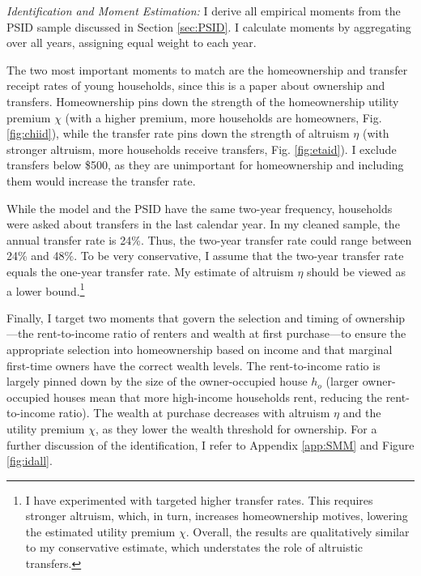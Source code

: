 \documentclass[12pt]{article}
\begin{document}
\textit{Identification and Moment Estimation:}
I derive all empirical moments from the PSID sample discussed in Section \ref{sec:PSID}. I calculate moments by aggregating over all years, assigning equal weight to each year.

The two most important moments to match are the homeownership and transfer receipt rates of young households, since this is a paper about ownership and transfers. Homeownership pins down the strength of the homeownership utility premium $\chi$ (with a higher premium, more households are homeowners, Fig. \ref{fig:chiid}), while the transfer rate pins down the strength of altruism $\eta$ (with stronger altruism, more households receive transfers, Fig. \ref{fig:etaid}). I exclude transfers below \$500, as they are unimportant for homeownership and including them would increase the transfer rate.

While the model and the PSID have the same two-year frequency, households were asked about transfers in the last calendar year. In my cleaned sample, the annual transfer rate is 24\%. Thus, the two-year transfer rate could range between 24\% and 48\%. To be very conservative, I assume that the two-year transfer rate equals the one-year transfer rate. My estimate of altruism $\eta$ should be viewed as a lower bound.\footnote{I have experimented with targeted higher transfer rates. This requires stronger altruism, which, in turn, increases homeownership motives, lowering the estimated utility premium $\chi$. Overall, the results are qualitatively similar to my conservative estimate, which understates the role of altruistic transfers.}

Finally, I target two moments that govern the selection and timing of ownership---the rent-to-income ratio of renters and wealth at first purchase---to ensure the appropriate selection into homeownership based on income and that marginal first-time owners have the correct wealth levels. The rent-to-income ratio is largely pinned down by the size of the owner-occupied house $h_o$ (larger owner-occupied houses mean that more high-income households rent, reducing the rent-to-income ratio). The wealth at purchase decreases with altruism $\eta$ and the utility premium $\chi$, as they lower the wealth threshold for ownership. For a further discussion of the identification, I refer to Appendix \ref{app:SMM} and Figure \ref{fig:idall}.
\end{document}
